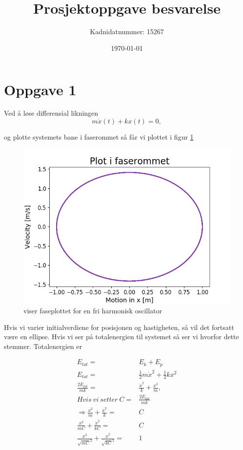 \documentclass[norsk,a4paper,12pt]{article}
\title{Prosjektoppgave besvarelse}
\author{Kadnidatnummer: 15267}
\date{\today}
\begin{document}
\maketitle


\section*{Oppgave 1}

Ved å løse differensial likningen
\\

\begin{equation}
	m\ddot{x}(t) + kx(t) =0,
\end{equation}

og plotte systemets bane i faserommet så får vi plottet i figur \ref{fig:plotoppg1}
\\
\begin{figure}[h]
\begin{center}
\includegraphics[scale=0.8]{Oppgave1.png}
\caption{viser faseplottet for en fri harmonisk oscillator}
\label{fig:plotoppg1}
\end{center}
\end{figure}

Hvis vi varier initialverdiene for posisjonen og hastigheten, så vil det fortsatt være en ellipse. Hvis vi ser på totalenergien til systemet så ser vi hvorfor dette stemmer. Totalenergien er 

\begin{align*}
	E_{tot} =& E_k + E_p\\
	E_{tot} =& \frac{1}{2}m\dot{x}^2 + \frac{1}{2}kx^2\\
	\frac{2E_{tot}}{mk} =& \frac{\dot{x}^2}{k} + \frac{x^2}{m},\\
	Hvis\ vi\ setter\ C =& \frac{2E_{tot}}{mk}\\
	\Rightarrow \frac{x^2}{m} + \frac{\dot{x}^2}{k} =& C \\
	\frac{x^2}{mC} + \frac{\dot{x}^2}{kC} =& C \\
	\frac{x^2}{\sqrt{mC}^2} + \frac{\dot{x}^2}{\sqrt{kC}^2} =& 1 \\
\end{align*}
\end{document}

